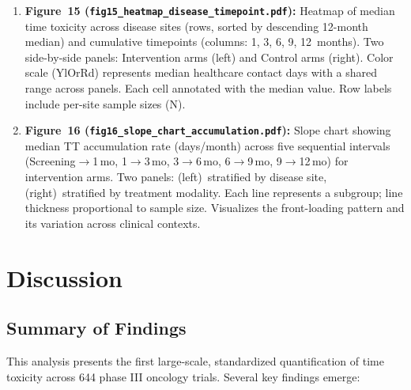 \documentclass[11pt,a4paper]{article}
\begin{document}
\begin{enumerate}
    \item \textbf{Figure~15 (\texttt{fig15\_heatmap\_disease\_timepoint.pdf}):} Heatmap of median time toxicity across disease sites (rows, sorted by descending 12-month median) and cumulative timepoints (columns: 1, 3, 6, 9, 12~months). Two side-by-side panels: Intervention arms (left) and Control arms (right). Color scale (YlOrRd) represents median healthcare contact days with a shared range across panels. Each cell annotated with the median value. Row labels include per-site sample sizes (N).

    \item \textbf{Figure~16 (\texttt{fig16\_slope\_chart\_accumulation.pdf}):} Slope chart showing median TT accumulation rate (days/month) across five sequential intervals (Screening$\rightarrow$1\,mo, 1$\rightarrow$3\,mo, 3$\rightarrow$6\,mo, 6$\rightarrow$9\,mo, 9$\rightarrow$12\,mo) for intervention arms. Two panels: (left)~stratified by disease site, (right)~stratified by treatment modality. Each line represents a subgroup; line thickness proportional to sample size. Visualizes the front-loading pattern and its variation across clinical contexts.
\end{enumerate}

\section{Discussion}

\subsection{Summary of Findings}

This analysis presents the first large-scale, standardized quantification of time toxicity across 644 phase III oncology trials. Several key findings emerge:
\end{document}
